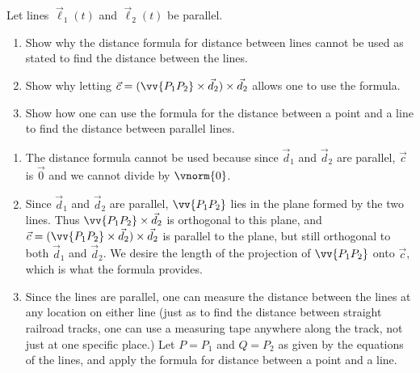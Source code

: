 {Let lines $\vec \ell_1(t)$ and $\vec \ell_2(t)$ be parallel. 
\begin{enumerate}
	\item Show why the distance formula for distance between lines cannot be used as stated to find the distance between the lines.
	\item	Show why letting $\vec c=(\vv{P_1P_2}\times\vec d_2)\times\vec d_2$ allows one to use the formula.
	\item	Show how one can use the formula for the distance between a point and a line to find the distance between parallel lines.	
\end{enumerate}
}
{\begin{enumerate}
	\item The distance formula cannot be used because since $\vec d_1$ and $\vec d_2$ are parallel, $\vec c$ is $\vec 0$ and we cannot divide by $\vnorm{0}$.
	\item	Since $\vec d_1$ and $\vec d_2$ are parallel, $\vv{P_1P_2}$ lies in the plane formed by the two lines. Thus $\vv{P_1P_2}\times\vec d_2$ is orthogonal to this plane, and $\vec c=(\vv{P_1P_2}\times\vec d_2)\times \vec d_2$ is parallel to the plane, but still orthogonal to both $\vec d_1$ and $\vec d_2$. We desire the length of the projection of $\vv{P_1P_2}$ onto $\vec c$, which is what the formula provides.
	\item		Since the lines are parallel, one can measure the distance between the lines at any location on either line (just as to find the distance between straight railroad tracks, one can use a measuring tape anywhere along the track, not just at one specific place.) Let $P=P_1$ and $Q=P_2$ as given by the equations of the lines, and apply the formula for distance between a point and a line.
\end{enumerate}


}


